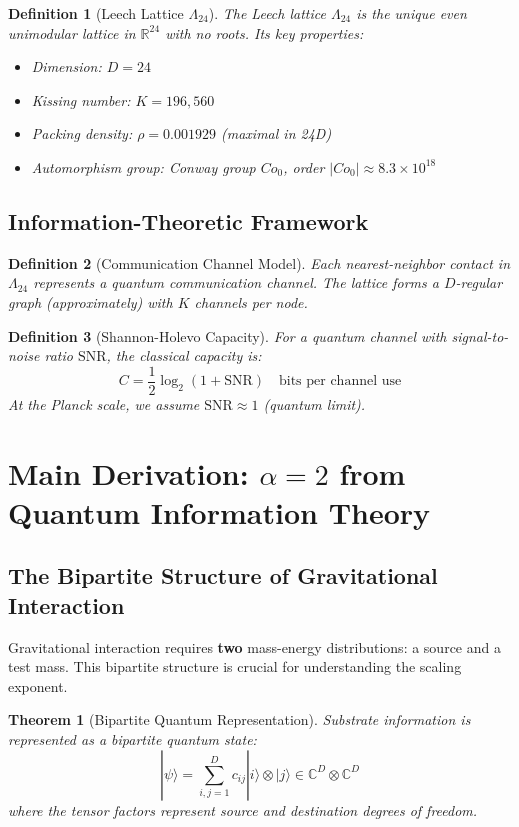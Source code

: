 \documentclass[11pt]{article}
\newtheorem{theorem}{Theorem}
\newtheorem{definition}{Definition}
\begin{document}
\begin{definition}[Leech Lattice $\Lambda_{24}$]
The Leech lattice $\Lambda_{24}$ is the unique even unimodular lattice in $\mathbb{R}^{24}$ with no roots. Its key properties:
\begin{itemize}
\item Dimension: $D = 24$
\item Kissing number: $K = 196,\!560$
\item Packing density: $\rho = 0.001929$ (maximal in 24D)
\item Automorphism group: Conway group $Co_0$, order $|Co_0| \approx 8.3\times10^{18}$
\end{itemize}
\end{definition}

\subsection{Information-Theoretic Framework}

\begin{definition}[Communication Channel Model]
Each nearest-neighbor contact in $\Lambda_{24}$ represents a quantum communication channel. The lattice forms a $D$-regular graph (approximately) with $K$ channels per node.
\end{definition}

\begin{definition}[Shannon-Holevo Capacity]
For a quantum channel with signal-to-noise ratio $\text{SNR}$, the classical capacity is:
\[
C = \frac{1}{2} \log_2(1 + \text{SNR}) \quad \text{bits per channel use}
\]
At the Planck scale, we assume $\text{SNR} \approx 1$ (quantum limit).
\end{definition}

\section{Main Derivation: $\alpha=2$ from Quantum Information Theory}

\subsection{The Bipartite Structure of Gravitational Interaction}

Gravitational interaction requires \textbf{two} mass-energy distributions: a source and a test mass. This bipartite structure is crucial for understanding the scaling exponent.

\begin{theorem}[Bipartite Quantum Representation]
Substrate information is represented as a bipartite quantum state:
\[
|\psi\rangle = \sum_{i,j=1}^{D} c_{ij} |i\rangle \otimes |j\rangle \in \mathbb{C}^D \otimes \mathbb{C}^D
\]
where the tensor factors represent source and destination degrees of freedom.
\end{theorem}
\end{document}
